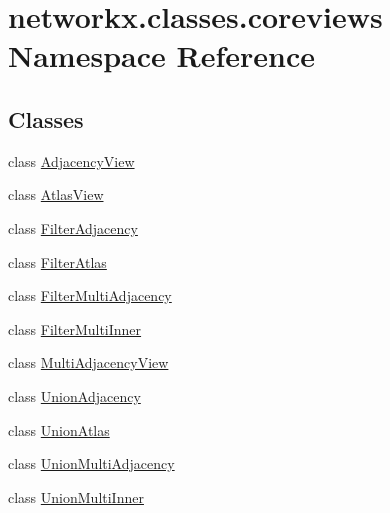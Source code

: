 \hypertarget{namespacenetworkx_1_1classes_1_1coreviews}{}\section{networkx.\+classes.\+coreviews Namespace Reference}
\label{namespacenetworkx_1_1classes_1_1coreviews}
\subsection*{Classes}
\begin{DoxyCompactItemize}
\item 
class \hyperlink{classnetworkx_1_1classes_1_1coreviews_1_1AdjacencyView}{Adjacency\+View}
\item 
class \hyperlink{classnetworkx_1_1classes_1_1coreviews_1_1AtlasView}{Atlas\+View}
\item 
class \hyperlink{classnetworkx_1_1classes_1_1coreviews_1_1FilterAdjacency}{Filter\+Adjacency}
\item 
class \hyperlink{classnetworkx_1_1classes_1_1coreviews_1_1FilterAtlas}{Filter\+Atlas}
\item 
class \hyperlink{classnetworkx_1_1classes_1_1coreviews_1_1FilterMultiAdjacency}{Filter\+Multi\+Adjacency}
\item 
class \hyperlink{classnetworkx_1_1classes_1_1coreviews_1_1FilterMultiInner}{Filter\+Multi\+Inner}
\item 
class \hyperlink{classnetworkx_1_1classes_1_1coreviews_1_1MultiAdjacencyView}{Multi\+Adjacency\+View}
\item 
class \hyperlink{classnetworkx_1_1classes_1_1coreviews_1_1UnionAdjacency}{Union\+Adjacency}
\item 
class \hyperlink{classnetworkx_1_1classes_1_1coreviews_1_1UnionAtlas}{Union\+Atlas}
\item 
class \hyperlink{classnetworkx_1_1classes_1_1coreviews_1_1UnionMultiAdjacency}{Union\+Multi\+Adjacency}
\item 
class \hyperlink{classnetworkx_1_1classes_1_1coreviews_1_1UnionMultiInner}{Union\+Multi\+Inner}
\end{DoxyCompactItemize}
